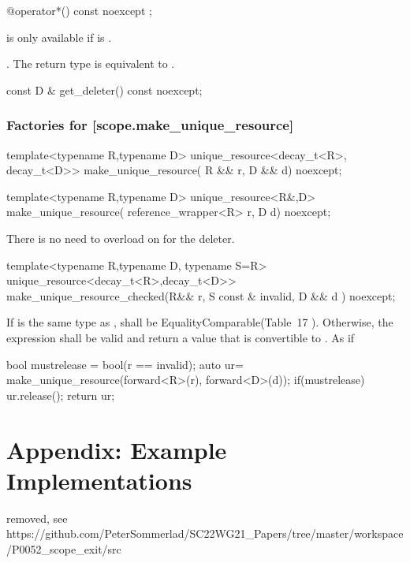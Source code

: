 \documentclass[ebook,11pt,article]{memoir}
\begin{document}
\begin{itemdecl}
@\seebelow@ operator*() const noexcept ;
\end{itemdecl}

\pnum
\requires {} is only available if  is .

\pnum
\returns {}. \enternote The return type is equivalent to 
. \exitnote


\begin{itemdecl}
const D & get_deleter() const noexcept;
\end{itemdecl}

\pnum
\returns {}

\subsection {Factories for  [scope.make_unique_resource]}
\begin{itemdecl}
template<typename R,typename D>
unique_resource<decay_t<R>, decay_t<D>>
make_unique_resource( R && r, D && d) noexcept;
\end{itemdecl}

\pnum
\returns {}

\begin{itemdecl}
template<typename R,typename D>
unique_resource<R&,D>
make_unique_resource( reference_wrapper<R> r, D d) noexcept;
\end{itemdecl}

\pnum
\returns {}

\pnum \enternote There is no need to overload on  for the deleter. \exitnote



\begin{itemdecl}
template<typename R,typename D, typename S=R>
unique_resource<decay_t<R>,decay_t<D>>
make_unique_resource_checked(R&& r, S const & invalid, D && d ) noexcept;
\end{itemdecl}

\pnum
\requires If  is the same type as ,  shall be EqualityComparable(Table~17
). Otherwise, the expression  shall be valid and return a value that is convertible to . 
\pnum
\effects As if
\begin{codeblock}
  bool mustrelease = bool(r == invalid);
  auto ur= make_unique_resource(forward<R>(r), forward<D>(d));
  if(mustrelease) ur.release();
  return ur;
\end{codeblock}

\newpage
\chapter{Appendix: Example Implementations}
removed, see \\
https://github.com/PeterSommerlad/SC22WG21_Papers/tree/master/workspace/P0052_scope_exit/src
\end{document}
